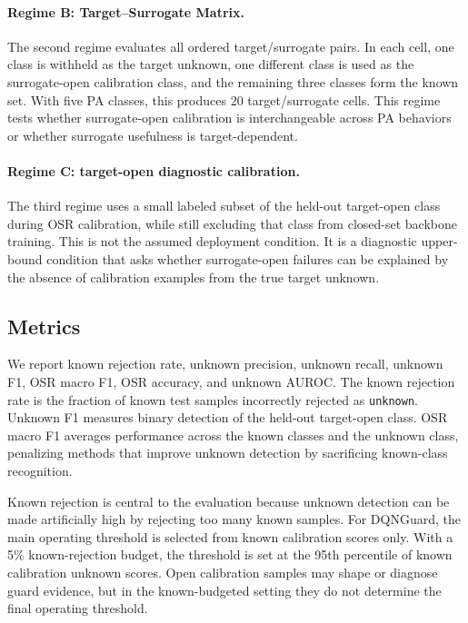 \paragraph{Regime B: Target--Surrogate Matrix.}
The second regime evaluates all ordered target/surrogate pairs. In each cell, one class is withheld as the target unknown, one different class is used as the surrogate-open calibration class, and the remaining three classes form the known set. With five PA classes, this produces 20 target/surrogate cells. This regime tests whether surrogate-open calibration is interchangeable across PA behaviors or whether surrogate usefulness is target-dependent.

\paragraph{Regime C: target-open diagnostic calibration.}
The third regime uses a small labeled subset of the held-out target-open class during OSR calibration, while still excluding that class from closed-set backbone training. This is not the assumed deployment condition. It is a diagnostic upper-bound condition that asks whether surrogate-open failures can be explained by the absence of calibration examples from the true target unknown.

\subsection{Metrics}
\label{subsec:metrics}

We report known rejection rate, unknown precision, unknown recall, unknown F1, OSR macro F1, OSR accuracy, and unknown AUROC. The known rejection rate is the fraction of known test samples incorrectly rejected as \texttt{unknown}. Unknown F1 measures binary detection of the held-out target-open class. OSR macro F1 averages performance across the known classes and the unknown class, penalizing methods that improve unknown detection by sacrificing known-class recognition.

Known rejection is central to the evaluation because unknown detection can be made artificially high by rejecting too many known samples. For DQNGuard, the main operating threshold is selected from known calibration scores only. With a 5\% known-rejection budget, the threshold is set at the 95th percentile of known calibration unknown scores. Open calibration samples may shape or diagnose guard evidence, but in the known-budgeted setting they do not determine the final operating threshold.
